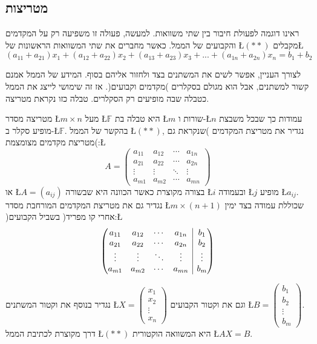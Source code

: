 \subsection{מטריצות}

ראינו דוגמה לפעולת חיבור בין שתי משוואות. למעשה, פעולה זו משפיעה רק
על המקדמים והקבועים של הממ\textquotedbl ל. כאשר מחברים את שתי המשוואות
הראשונות של \L{$(**)$} מקבלים\L{%
\[
(a_{11}+a_{21})x_{1}+(a_{12}+a_{22})x_{2}+(a_{13}+a_{23})x_{3}+...+(a_{1n}+a_{2n})x_{n}=b_{1}+b_{2}
\]
}%

לצורך העניין, אפשר לשים את המשתנים בצד ולחזור אליהם בסוף. המידע של
הממ\textquotedbl ל אמנם קשור למשתנים, אבל הוא מגולם בסקלרים )מקדמים
וקבועים(. אז זה שימושי לייצג את הממ\textquotedbl ל כטבלה שבה מופיעים
רק הסקלרים. טבלה כזו נקראת מטריצה.

\begin{hdef}
מטריצה מסדר \L{$m\times n$} מעל \L{$\mathbb{F}$} היא טבלה
בת \L{$m$} שורות ו-\L{$n$} עמודות כך שבכל משבצת מופיע סקלר ב-\L{$\mathbb{F}$}.
בהקשר של הממ\textquotedbl ל \L{$(**)$}, נגדיר את מטריצת המקדמים
)שנקראת גם מטריצת מקדמים מצומצמת(:\L{%
\[
A=\begin{pmatrix}a_{11} & a_{12} & \cdots & a_{1n}\\
a_{21} & a_{22} & \cdots & a_{2n}\\
\vdots & \vdots & \ddots & \vdots\\
a_{m1} & a_{m2} & \cdots & a_{mn}
\end{pmatrix}
\]
}%
או \L{$A=(a_{ij})$} בצורה מקוצרת כאשר הכוונה היא שבשורה \L{$i$}
ובעמודה \L{$j$} מופיע \L{$a_{ij}$}. נגדיר גם את מטריצת המקדמים המורחבת
מסדר \L{$m\times(n+1)$} שכוללת עמודה בצד ימין )אחרי קו מפריד( בשביל
הקבועים:\L{%
\[
\left( \begin{array}{@{}cccc|c@{}}
	a_{11} & a_{12} & \cdots & a_{1n} & b_{1} \\
	a_{21} & a_{22} & \cdots & a_{2n} & b_{2} \\
	\vdots & \vdots & \ddots & \vdots & \vdots \\
	a_{m1} & a_{m2} & \cdots & a_{mn} & b_{m}
\end{array} \right)
\]
}%

נגדיר בנוסף את וקטור המשתנים \L{$X=\begin{pmatrix}x_{1}\\
x_{2}\\
\vdots\\
x_{n}
\end{pmatrix}$} וגם את וקטור הקבועים \L{$B=\begin{pmatrix}b_{1}\\
b_{2}\\
\vdots\\
b_{m}
\end{pmatrix}$}. דרך מקוצרת לכתיבת הממ\textquotedbl ל \L{$(**)$} היא המשוואה הוקטורית
\L{$AX=B$}.
\end{hdef}

